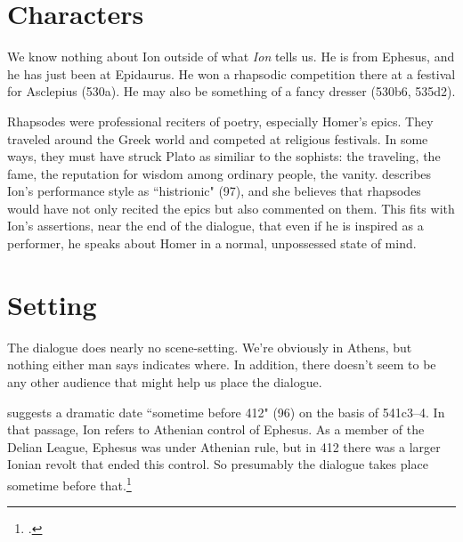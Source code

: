 \documentclass[12pt,letterpaper]{article}
\begin{document}


\section{Characters}

We know nothing about Ion outside of what \textit{Ion} tells us. He is from
Ephesus, and he has just been at Epidaurus. He won a rhapsodic competition
there at a festival for Asclepius (530a). He may also be something of
a fancy dresser (530b6, 535d2).

Rhapsodes were professional reciters of poetry, especially Homer's epics.
They traveled around the Greek world and competed at religious festivals.
In some ways, they must have struck Plato as similiar to the sophists: the
traveling, the fame, the reputation for wisdom among ordinary people, the
vanity. \textcite{murray1996} describes Ion's performance style as
``histrionic" (97), and she believes that rhapsodes would have not only
recited the epics but also commented on them. This fits with Ion's
assertions, near the end of the dialogue, that even if he is inspired as
a performer, he speaks about Homer in a normal, unpossessed state of mind.


\section{Setting}

The dialogue does nearly no scene-setting. We're obviously in Athens, but nothing either man says indicates where. In addition, there doesn't seem to be any other audience that might help us place the dialogue.

\textcite{murray1996} suggests a dramatic date ``sometime before 412" (96) on the basis of 541c3--4. In that passage, Ion refers to Athenian control of Ephesus. As a member of the Delian League, Ephesus was under Athenian rule, but in 412 there was a larger Ionian revolt that ended this control. So presumably the dialogue takes place sometime before that.\footcites[See][]{moore1974}[and also][28--31, 163--4]{canto2001}


\end{document}
